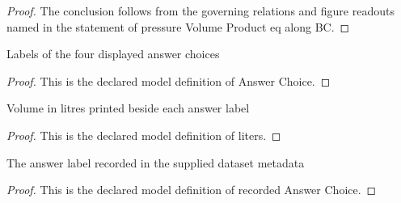 \begin{proof}
  The conclusion follows from the governing relations and figure readouts named in the statement of pressure Volume Product eq along BC.
\end{proof}
\begin{definition}
  \label{def:physics:phyx-mini-0343:phyxminiproblems-problemphyxmini0343-answerchoice}
  Labels of the four displayed answer choices
\end{definition}
\begin{proof}
  This is the declared model definition of Answer Choice.
\end{proof}
\begin{definition}[liters]
  \label{def:physics:phyx-mini-0343:phyxminiproblems-problemphyxmini0343-answerchoice-liters}
  Volume in litres printed beside each answer label
\end{definition}
\begin{proof}
  This is the declared model definition of liters.
\end{proof}
\begin{definition}
  \label{def:physics:phyx-mini-0343:phyxminiproblems-problemphyxmini0343-recordedanswerchoice}
  The answer label recorded in the supplied dataset metadata
\end{definition}
\begin{proof}
  This is the declared model definition of recorded Answer Choice.
\end{proof}
